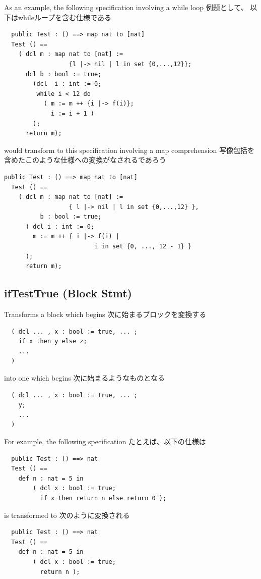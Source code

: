 \documentclass[\pformat,12pt]{jarticle}
\begin{document}
As an example, the following specification involving a while loop
例題として、 以下はwhileループを含む仕様である

\begin{verbatim}
  public Test : () ==> map nat to [nat]
  Test () ==
    ( dcl m : map nat to [nat] := 
                  {l |-> nil | l in set {0,...,12}};
      dcl b : bool := true;
        (dcl  i : int := 0;
         while i < 12 do
           ( m := m ++ {i |-> f(i)};
             i := i + 1 )
        );
      return m);
\end{verbatim}

would transform to this specification involving a map comprehension
写像包括を含めたこのような仕様への変換がなされるであろう

\begin{verbatim}
public Test : () ==> map nat to [nat]
  Test () ==
    ( dcl m : map nat to [nat] := 
                  { l |-> nil | l in set {0,...,12} },
          b : bool := true;
      ( dcl i : int := 0;
        m := m ++ { i |-> f(i) | 
                         i in set {0, ..., 12 - 1} }
      );
      return m);
\end{verbatim}


\subsection{ifTestTrue (Block Stmt)}
  Transforms a block which begins
  次に始まるブロックを変換する

\begin{verbatim}
  ( dcl ... , x : bool := true, ... ; 
    if x then y else z;
    ...
  )
\end{verbatim}

into one which begins
次に始まるようなものとなる

\begin{verbatim}
  ( dcl ... , x : bool := true, ... ; 
    y;
    ...
  )
\end{verbatim}

For example, the following specification
たとえば、以下の仕様は

\begin{verbatim}
  public Test : () ==> nat  
  Test () ==
    def n : nat = 5 in
        ( dcl x : bool := true;
          if x then return n else return 0 );
\end{verbatim}

is transformed to
次のように変換される

\begin{verbatim}
  public Test : () ==> nat  
  Test () ==
    def n : nat = 5 in
        ( dcl x : bool := true;
          return n );
\end{verbatim}
\end{document}
